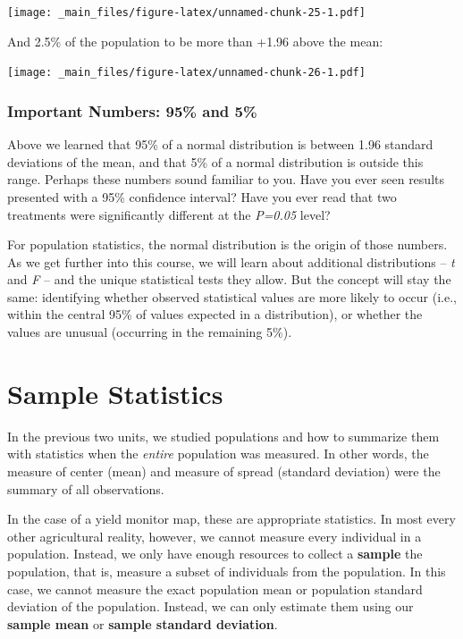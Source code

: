 \documentclass[
]{book}
\begin{document}
\texttt{[image: \_main\_files/figure-latex/unnamed-chunk-25-1.pdf]}

And 2.5\% of the population to be more than +1.96 above the mean:

\texttt{[image: \_main\_files/figure-latex/unnamed-chunk-26-1.pdf]}

\hypertarget{important-numbers-95-and-5}{%
\subsection{Important Numbers: 95\% and 5\%}\label{important-numbers-95-and-5}}

Above we learned that 95\% of a normal distribution is between 1.96 standard deviations of the mean, and that 5\% of a normal distribution is outside this range. Perhaps these numbers sound familiar to you. Have you ever seen results presented with a 95\% confidence interval? Have you ever read that two treatments were significantly different at the \emph{P=0.05} level?

For population statistics, the normal distribution is the origin of those numbers. As we get further into this course, we will learn about additional distributions -- \emph{t} and \emph{F} -- and the unique statistical tests they allow. But the concept will stay the same: identifying whether observed statistical values are more likely to occur (i.e., within the central 95\% of values expected in a distribution), or whether the values are unusual (occurring in the remaining 5\%).

\hypertarget{sample-statistics}{%
\chapter{Sample Statistics}\label{sample-statistics}}

In the previous two units, we studied populations and how to summarize
them with statistics when the \emph{entire} population was measured. In other
words, the measure of center (mean) and measure of spread (standard
deviation) were the summary of all observations.

In the case of a yield monitor map, these are appropriate statistics. In
most every other agricultural reality, however, we cannot measure every
individual in a population. Instead, we only have enough resources to
collect a \textbf{sample} the population, that is, measure a subset of
individuals from the population. In this case, we cannot measure the
exact population mean or population standard deviation of the
population. Instead, we can only estimate them using our \textbf{sample mean}
or \textbf{sample standard deviation}.
\end{document}
